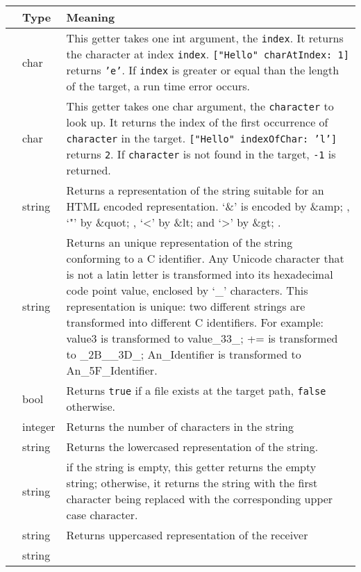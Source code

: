\documentclass[11pt]{article}
\newcommand{\character}[1]{{\small\ttfamily `{#1}'}}
\newcommand{\cdata}[1]{{\ttfamily #1}}
\begin{document}
\begin{longtable}{>{\ttfamily}l|l|p{2.68in}}
{\bf getter}&{\bf Type}&{\bf Meaning}\\
\hline\endhead
 {charAtIndex}&
  {char}&
  {This getter takes one int argument, the \texttt{index}. It returns the character at index \texttt{index}. \texttt{["Hello" charAtIndex: 1]} returns \texttt{'e'}. If \texttt{index} is greater or equal than the length of the target, a run time error occurs.}\\
 {indexOfChar}&
  {char}&
  {This getter takes one char argument, the \texttt{character} to look up. It returns the index of the first occurrence of \texttt{character} in the target. \texttt{["Hello" indexOfChar: 'l']} returns \texttt{2}. If \texttt{character} is not found in the target, \texttt{-1} is returned.}\\
 {HTMLRepresentation}&
  {string}&
  {Returns a representation of the string suitable for an HTML encoded representation. \character{\&} is encoded by \cdata{\&amp;} , \character{"} by \cdata{\&quot;} , \character{<} by \cdata{\&lt;} and \character{>} by \cdata{\&gt;} .}\\
 {identifierRepresentation}&
  {string}&
  {Returns an unique representation of the string conforming to a C identifier. Any Unicode character that is not a latin letter is transformed into its hexadecimal code point value, enclosed by \character{_} characters. This representation is unique: two different strings are transformed into different C identifiers. For example: \cdata{value3} is transformed to \cdata{value_33_}; \cdata{+=} is transformed to \cdata{_2B__3D_};
\cdata{An_Identifier} is transformed to \cdata{An_5F_Identifier}.}\\
 {fileExists}&
  {bool}&
  {Returns \texttt{true} if a file exists at the target path, \texttt{false} otherwise.}\\
 {length}&
  {integer}&
  {Returns the number of characters in the string}\\
 {lowercaseString}&
  {string}&
  {Returns the lowercased representation of the string.}\\
 {capitalized}&
  {string}&
  {if the string is empty, this getter returns the empty string; otherwise, it returns the string with the first character being replaced with the corresponding upper case character.}\\
 {uppercaseString}&
  {string}&
  {Returns uppercased representation of the receiver}\\
 {leftSubString}&
  {string}&

\end{longtable}
\end{document}
